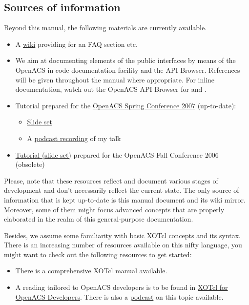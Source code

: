 \subsection{Sources of information}
Beyond this manual, the following materials are currently available.
\begin{itemize}
\item A \href{http://alice.wu-wien.ac.at:8000/xorb-doc}{wiki} providing for an FAQ section etc.
\item We aim at documenting elements of the public interfaces by means of the OpenACS in-code 
documentation facility and the API Browser. References will be given throughout the manual where 
appropriate. For inline documentation, watch out the OpenACS API Browser for  and .
\item Tutorial prepared for the \href{http://oacs-dotlrn-conf2007.wu-wien.ac.at/}{OpenACS Spring 
Conference 2007} (up-to-date):
\begin{itemize} 
\item \href{http://oacs-dotlrn-conf2007.wu-wien.ac.at/conf2007/file/sobernig-xosoap-slides.pdf?
m=download|Slide set}{Slide set}
\item A \href{http://oacs-dotlrn-conf2007.wu-wien.ac.at/conf2007/file/tutorial-sobernig.mp4?
m=download}{podcast recording} of my talk
\end{itemize}
\item \href{http://nm.wu-wien.ac.at/research/publications/b670.pdf}{Tutorial (slide set)} prepared for the 
OpenACS Fall Conference 2006 (obsolete) 
\end{itemize}
Please, note that these resources reflect and document various stages of development and don't 
necessarily reflect the current state. The only source of information that is kept up-to-date is this manual 
document and its wiki mirror. Moreover, some of them might focus advanced concepts that are properly 
elaborated in the realm of this general-purpose documentation.

Besides, we assume some familiarity with basic XOTcl concepts and its syntax. There is an increasing number of resources available on this nifty language, you might want to check out the following resources to get started:

\begin{itemize}
\item There is a comprehensive \href{http://media.wu-wien.ac.at/doc/tutorial.html}{XOTcl manual} available.
\item A reading tailored to OpenACS developers is to be found in \href{http://www.matuska.org/martin/doc/xotcl-openacs-2007.pdf}{XOTcl for OpenACS Developers}. There is also a \href{http://www.matuska.org/martin/doc/xotcl-openacs-2007-p.pdf}{podcast} on this topic available.
\end{itemize}

